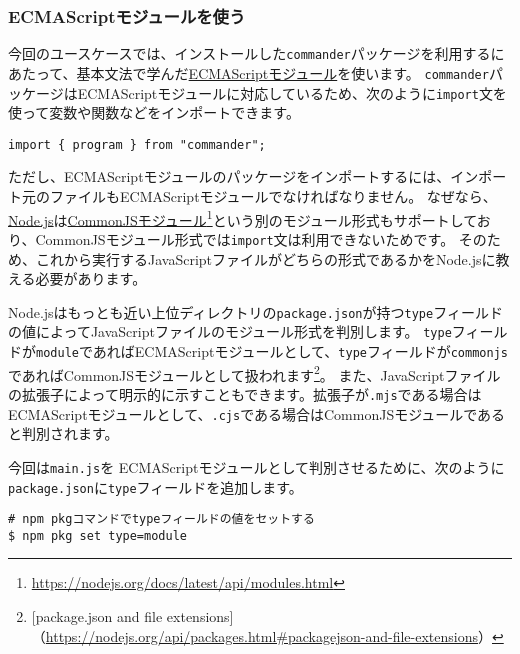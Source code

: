 \hypertarget{esmodule}{%
\subsubsection{ECMAScriptモジュールを使う}\label{esmodule}}

今回のユースケースでは、インストールした\texttt{commander}パッケージを利用するにあたって、基本文法で学んだ\hyperlink{module}{ECMAScriptモジュール}を使います。
\texttt{commander}パッケージはECMAScriptモジュールに対応しているため、次のように\texttt{import}文を使って変数や関数などをインポートできます。

\begin{lstlisting}
import { program } from "commander";
\end{lstlisting}

ただし、ECMAScriptモジュールのパッケージをインポートするには、インポート元のファイルもECMAScriptモジュールでなければなりません。
なぜなら、\href{https://nodejs.org/ja/}{Node.js}は\href{https://nodejs.org/docs/latest/api/modules.html}{CommonJSモジュール}\footnote{\url{https://nodejs.org/docs/latest/api/modules.html}}という別のモジュール形式もサポートしており、CommonJSモジュール形式では\texttt{import}文は利用できないためです。
そのため、これから実行するJavaScriptファイルがどちらの形式であるかをNode.jsに教える必要があります。

Node.jsはもっとも近い上位ディレクトリの\texttt{package.json}が持つ\texttt{type}フィールドの値によってJavaScriptファイルのモジュール形式を判別します。
\texttt{type}フィールドが\texttt{module}であればECMAScriptモジュールとして、\texttt{type}フィールドが\texttt{commonjs}であればCommonJSモジュールとして扱われます\footnote{[package.json and file extensions]（\url{https://nodejs.org/api/packages.html\#packagejson-and-file-extensions}）}。
また、JavaScriptファイルの拡張子によって明示的に示すこともできます。拡張子が\texttt{.mjs}である場合はECMAScriptモジュールとして、\texttt{.cjs}である場合はCommonJSモジュールであると判別されます。

今回は\texttt{main.js}を ECMAScriptモジュールとして判別させるために、次のように \texttt{package.json}に\texttt{type}フィールドを追加します。

\begin{lstlisting}
# npm pkgコマンドでtypeフィールドの値をセットする
$ npm pkg set type=module
\end{lstlisting}



